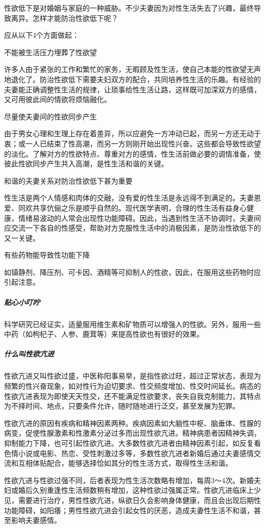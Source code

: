 \begin{enumerate}
性欲低下是对婚姻与家庭的一种威胁。不少夫妻因为对性生活失去了兴趣，最终导致离异。怎样才能防治性欲低下呢？

应从以下4个方面做起：

不能被生活压力埋葬了性欲望

许多人由于紧张的工作和繁忙的家务，无暇顾及性生活，使自己本能的性欲望无声地退化了。防治性欲低下需要夫妇双方的配合，共同培养性生活的乐趣。有经验的夫妻能正确调整性生活的规律，让琐事给性生活让路，这样既可加深双方的感情，又可用彼此间的情欲将烦恼融化。

尽量使夫妻间的性欲同步产生

由于男女心理和生理上存在着差异，所以应避免一方冲动已起，而另一方还无动于衷；或一人已结束了性高潮，而另一方则刚开始出现性兴奋。这些都会导致性欲望的淡化。了解对方的性欲特点、尊重对方的感情，性生活前做必要的调情准备，使彼此性欲同步产生共入高潮，是性生活和谐的关键。

和谐的夫妻关系对防治性欲低下甚为重要

性生活是两个人情感和肉体的交融，没有爱的性生活是永远得不到满足的。夫妻恩爱、同欢共享伉俪之乐是顺乎自然的。现代医学表明，合理的性生活有益身心健康，情绪易波动的人常会出现性功能障碍。因此，当遇到性生活不协调时，夫妻间应交流一下各自的性感受，帮助对方克服性生活中的消极因素，是防治性欲低下的又一关键。

有些药物能导致性功能下降

如镇静剂、降压剂、可卡因、酒精等可抑制人的性欲，因此，在服用这些药物时应引起注意。

\subparagraph{贴心小叮咛}

科学研究已经证实，适量服用维生素和矿物质可以增强人的性欲。另外，服用一些中药（如枸杞子、人参、鹿茸等）来提高性欲也有很好的效果。

\subparagraph{什么叫性欲亢进}

性欲亢进又叫性欲过盛，中医称阳事易举，是指性欲过旺，超过正常状态，表现为频繁的性兴奋现象，如对性行为迫切要求、性交频度增加、性交时间延长。病态的性欲亢进表现为即使天天性交，还不能满足性欲要求，丧失自我克制能力，其特点为不择时间、地点，只要条件允许，随时随地进行泛交，甚至发展为犯罪。

性欲亢进的原因有疾病和精神因素两种。疾病因素如大脑性中枢、脑垂体、性腺的病变，促使性腺激素和性激素分泌过多而出现性欲亢进。精神病患者因精神失调，抑制能力下降，也可引起性欲亢进。大多数性欲亢进者由精神因素引起，如反复看色情小说或电影、热恋、受性刺激过多等，多数性欲亢进者新婚后通过夫妻感情交流和互相体贴配合，能够选择恰如其分的性生活方式，取得性生活和谐。

性欲亢进与性欲过强不同，后者表现为性生活次数略有增加，每周3～4次。新婚夫妇或婚后久别重逢性生活频数稍有增加，这种性欲过强属正常。性欲亢进临床上少见，需要进行治疗，男性性欲亢进，纵欲日久会影响身体健康，而且会出现后期性功能障碍，如阳痿；男性性欲亢进会引起女性的厌恶，造成夫妻性生活不和谐，甚至影响夫妻感情。


\end{enumerate}
